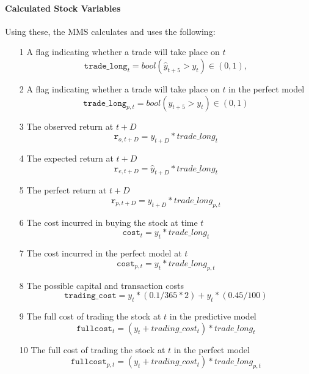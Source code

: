 \documentclass[a4paper,11pt,oneside]{article}
\theoremstyle{plain}
\theoremstyle{definition}
\begin{document}
\paragraph{Calculated Stock Variables}

Using these, the MMS calculates and uses the following:

\begin{itemize}
	\item [1] A flag indicating whether a trade will take place on $t$
				\begin{equation}
				\texttt{trade\_long}_t = bool(\hat{y}_{t+5} > y_t) \in (0, 1), 
				\end{equation}
	\item [2] A flag indicating whether a trade will take place on $t$ in the perfect model
				\begin{equation}
				\texttt{trade\_long}_{p,t} = bool({y}_{t+5} > y_t) \in (0, 1)
				\end{equation}
	\item [3] The observed return at $t+D$
				\begin{equation}
				\texttt{r}_{o, t + D} = y_{t+D} * trade\_long_t
				\end{equation}	
	\item [4] The expected return at $t+D$
				\begin{equation}
				\texttt{r}_{e, t + D} = \hat{y}_{t+D} * trade\_long_t 
				\end{equation}
	\item [5] The perfect return at $t+D$
				\begin{equation}
				\texttt{r}_{p, t + D} = y_{t+D} * trade\_long_{p,t}
				\end{equation}
	\item [6] The cost incurred in buying the stock at time $t$
				\begin{equation}
				\texttt{cost}_t = y_t * trade\_long_t
				\end{equation}
	\item [7] The cost incurred in the perfect model at $t$
				\begin{equation}
				\texttt{cost}_{p,t} = y_t * trade\_long_{p,t}
				\end{equation}
	\item [8] The possible capital and transaction costs
				\begin{equation}
				\texttt{trading\_cost}= y_t * (0.1 / 365 * 2) + y_t * (0.45 / 100)
				\end{equation}
	\item [9] The full cost of trading the stock at $t$ in the predictive model
				\begin{equation}
				\texttt{fullcost}_t = (y_t + trading\_cost_t) * trade\_long_t
				\end{equation}	
	\item [10] The full cost of trading the stock at $t$ in the perfect model
				\begin{equation}
				\texttt{fullcost}_{p,t} = (y_t + trading\_cost_t) * trade\_long_{p, t}
				\end{equation}
\end{itemize}
\end{document}
